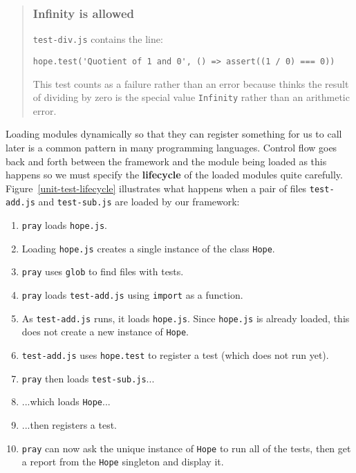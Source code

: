 \documentclass[krantzl]{krantz}
\newcommand{\figref}[1]{Figure~\ref{#1}}
\newcommand{\glossref}[1]{\textbf{#1}}
\newenvironment{callout}{\savenotes\begin{tBox}\begin{quotation}\toggletrue{inbox}\renewcommand{\thempfootnote}{\arabic{footnote}}}{\end{quotation}\vspace{\baselineskip}\end{tBox}\togglefalse{inbox}\spewnotes}
\begin{document}
\begin{callout}


\subsubsection*{Infinity is allowed}


\texttt{test-div.js} contains the line:

\begin{lstlisting}[frame=single,frameround=tttt]
hope.test('Quotient of 1 and 0', () => assert((1 / 0) === 0))
\end{lstlisting}


This test counts as a failure rather than an error
because thinks the result of dividing by zero is the special value \texttt{Infinity}
rather than an arithmetic error.

\end{callout}


Loading modules dynamically so that they can register something for us to call later
is a common pattern in many programming languages.
Control flow goes back and forth between the framework and the module being loaded
as this happens
so we must specify the \glossref{lifecycle} of the loaded modules quite carefully.
\figref{unit-test-lifecycle} illustrates what happens
when a pair of files \texttt{test-add.js} and \texttt{test-sub.js} are loaded by our framework:

\begin{enumerate}

\item \texttt{pray} loads \texttt{hope.js}.

\item Loading \texttt{hope.js} creates a single instance of the class \texttt{Hope}.

\item \texttt{pray} uses \texttt{glob} to find files with tests.

\item \texttt{pray} loads \texttt{test-add.js} using \texttt{import} as a function.

\item As \texttt{test-add.js} runs, it loads \texttt{hope.js}.
    Since \texttt{hope.js} is already loaded, this does not create a new instance of \texttt{Hope}.

\item \texttt{test-add.js} uses \texttt{hope.test} to register a test (which does not run yet).

\item \texttt{pray} then loads \texttt{test-sub.js}...

\item ...which loads \texttt{Hope}...

\item ...then registers a test.

\item \texttt{pray} can now ask the unique instance of \texttt{Hope} to run all of the tests,
     then get a report from the \texttt{Hope} singleton and display it.

\end{enumerate}
\end{document}
